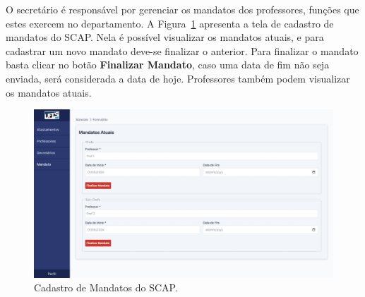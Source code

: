 O secretário é responsável por gerenciar os mandatos dos professores, funções que estes exercem
no departamento. A Figura~\ref{fig-mandato} apresenta a tela de cadastro de mandatos do SCAP.
Nela é possível visualizar os mandatos atuais, e para cadastrar um novo mandato deve-se finalizar o anterior.
Para finalizar o mandato basta clicar no botão \textbf{Finalizar Mandato}, caso uma data de fim não seja enviada,
será considerada a data de hoje. Professores também podem visualizar os mandatos atuais. 

\begin{figure}[h!]
    \centering
    \includegraphics[width=\textwidth]{figuras/prints-app/fig-mandato-visao-secretario.png}
    \caption{Cadastro de Mandatos do SCAP.}
    \label{fig-mandato}
\end{figure}

